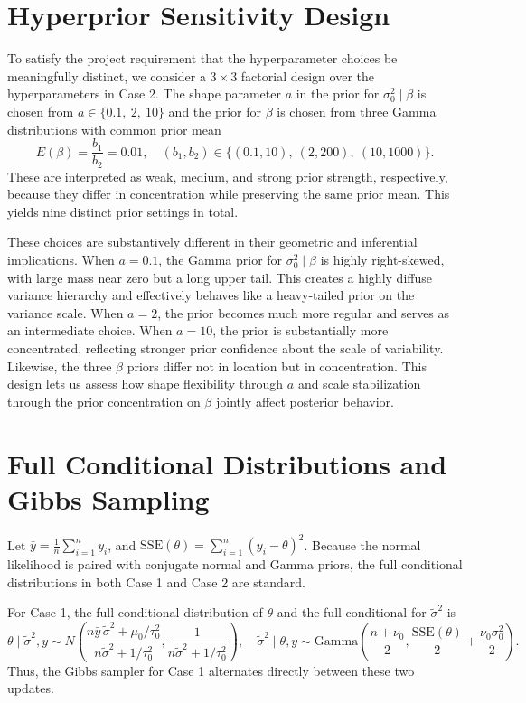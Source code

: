 \documentclass[11pt]{article}
\begin{document}
\section{Hyperprior Sensitivity Design}

To satisfy the project requirement that the hyperparameter choices be meaningfully distinct, we consider a $3\times 3$ factorial design over the hyperparameters in Case 2. The shape parameter $a$ in the prior for $\sigma_0^2\mid\beta$ is chosen from $a \in \{0.1,\ 2,\ 10\}$ and the prior for $\beta$ is chosen from three Gamma distributions with common prior mean
\[
E(\beta)=\frac{b_1}{b_2}=0.01,
\quad
(b_1,b_2) \in \{(0.1,10),\ (2,200),\ (10,1000)\}.
\]
These are interpreted as weak, medium, and strong prior strength, respectively, because they differ in concentration while preserving the same prior mean. This yields nine distinct prior settings in total.

These choices are substantively different in their geometric and inferential implications. When $a=0.1$, the Gamma prior for $\sigma_0^2\mid\beta$ is highly right-skewed, with large mass near zero but a long upper tail. This creates a highly diffuse variance hierarchy and effectively behaves like a heavy-tailed prior on the variance scale. When $a=2$, the prior becomes much more regular and serves as an intermediate choice. When $a=10$, the prior is substantially more concentrated, reflecting stronger prior confidence about the scale of variability. Likewise, the three $\beta$ priors differ not in location but in concentration. This design lets us assess how shape flexibility through $a$ and scale stabilization through the prior concentration on $\beta$ jointly affect posterior behavior.

\section{Full Conditional Distributions and Gibbs Sampling}

Let $\bar y = \frac{1}{n}\sum_{i=1}^n y_i$, and $\mathrm{SSE}(\theta)=\sum_{i=1}^n (y_i-\theta)^2$. Because the normal likelihood is paired with conjugate normal and Gamma priors, the full conditional distributions in both Case 1 and Case 2 are standard.

For Case 1, the full conditional distribution of $\theta$ and the full conditional for $\tilde{\sigma}^2$ is
\[
\theta \mid \tilde{\sigma}^2,y
\sim
N\left(
\frac{n\bar y\,\tilde{\sigma}^2+\mu_0/\tau_0^2}{n\tilde{\sigma}^2+1/\tau_0^2},
\frac{1}{n\tilde{\sigma}^2+1/\tau_0^2}
\right),
\quad
\tilde{\sigma}^2 \mid \theta,y
\sim
\mathrm{Gamma}\left(
\frac{n+\nu_0}{2},
\frac{\mathrm{SSE}(\theta)}{2}+\frac{\nu_0\sigma_0^2}{2}
\right).
\]
Thus, the Gibbs sampler for Case 1 alternates directly between these two updates.
\end{document}
